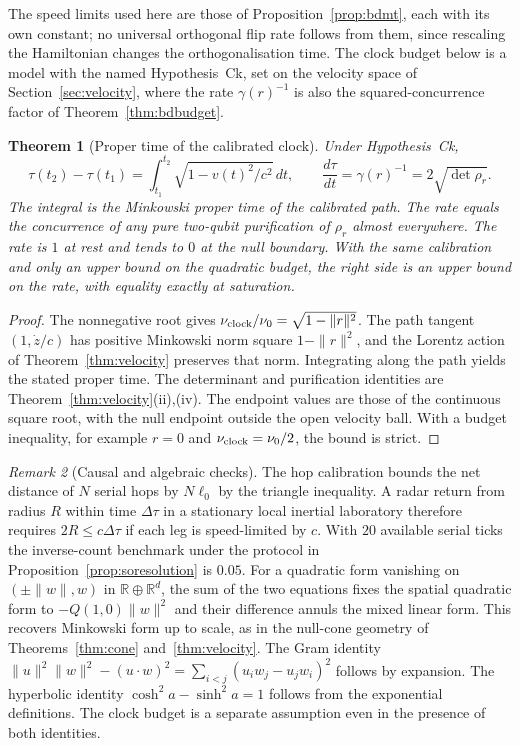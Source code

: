 \documentclass[aps,pra,onecolumn,superscriptaddress,nofootinbib,10pt]{revtex4-2}
\newtheorem{theorem}{Theorem}
\theoremstyle{definition}
\theoremstyle{remark}
\newtheorem{remark}[theorem]{Remark}
\begin{document}
\noindent The speed limits used here are those of Proposition~\ref{prop:bdmt}, each with its own constant; no
universal orthogonal flip rate follows from them, since rescaling the Hamiltonian changes the
orthogonalisation time.  The clock budget below is a model with the named Hypothesis~Ck, set on the velocity
space of Section~\ref{sec:velocity}, where the rate $\gamma(r)^{-1}$ is also the squared-concurrence factor of
Theorem~\ref{thm:bdbudget}.

\begin{theorem}[Proper time of the calibrated clock]\label{ub:clock}
Under Hypothesis~Ck,
\[
 \tau(t_2)-\tau(t_1)
 =\int_{t_1}^{t_2}\sqrt{1-v(t)^2/c^2}\,dt,\qquad
 \frac{d\tau}{dt}=\gamma(r)^{-1}=2\sqrt{\det\rho_r}.
\]
The integral is the Minkowski proper time of the calibrated path.
The rate equals the concurrence of any pure two-qubit purification
of $\rho_r$ almost everywhere. The rate is $1$ at rest and tends to $0$ at the
null boundary. With the same calibration and only an upper bound
on the quadratic budget, the right side is an upper bound on the
rate, with equality exactly at saturation.
\end{theorem}
\begin{proof}
The nonnegative root gives $\nu_{\rm clock}/\nu_0
=\sqrt{1-\|r\|^2}$. The path tangent $(1,\dot z/c)$ has positive
Minkowski norm square $1-\|r\|^2$, and the Lorentz action of
Theorem~\ref{thm:velocity} preserves that norm. Integrating along
the path yields the stated proper time. The determinant and
purification identities are Theorem~\ref{thm:velocity}(ii),(iv).
The endpoint values are those of the continuous square root, with
the null endpoint outside the open velocity ball. With a budget
inequality, for example $r=0$ and $\nu_{\rm clock}=\nu_0/2$,
the bound is strict.
\end{proof}

\begin{remark}[Causal and algebraic checks]\label{ub:clockchecks}
The hop calibration bounds the net distance of $N$ serial hops by
$N\ell_0$ by the triangle inequality. A radar return from radius
$R$ within time $\Delta\tau$ in a stationary local inertial laboratory
therefore requires $2R\le c\Delta\tau$ if each leg is speed-limited
by $c$. With $20$ available serial ticks the inverse-count benchmark
under the protocol in Proposition~\ref{prop:soresolution} is $0.05$.
For a quadratic form vanishing on $(\pm\|w\|,w)$ in
$\mathbb R\oplus\mathbb R^d$, the sum of the two equations fixes
the spatial quadratic form to $-Q(1,0)\|w\|^2$ and their difference
annuls the mixed linear form. This recovers Minkowski form up to
scale, as in the null-cone geometry of Theorems~\ref{thm:cone}
and~\ref{thm:velocity}. The Gram identity
$\|u\|^2\|w\|^2-(u\cdot w)^2=\sum_{i<j}(u_iw_j-u_jw_i)^2$ follows
by expansion. The hyperbolic identity $\cosh^2a-\sinh^2a=1$ follows
from the exponential definitions. The clock budget is a separate
assumption even in the presence of both identities.
\end{remark}
\end{document}
